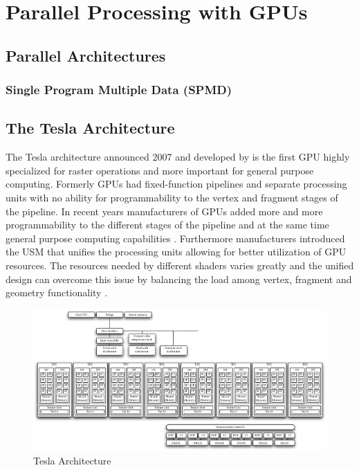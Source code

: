 

\chapter{Parallel Processing with GPUs}%
\label{cha:parallel_processing_with_gpu} 

\section{Parallel Architectures}
\label{sec:parallel_architectures} 

\subsection{Single Program Multiple Data (SPMD)}
\label{ssub:single_program_multiple_data_spmd} 



\section{The Tesla Architecture}%
\label{sub:the_tesla_architecture} 
The Tesla architecture announced 2007 and developed by {} is the first
\gls{GPU} highly specialized for raster operations and more important
for general purpose computing. Formerly \glspl{GPU} had fixed-function
pipelines and separate processing units with no ability for programmability to
the vertex and fragment stages of the pipeline. In recent years manufacturers of
\glspl{GPU} added more and more programmability to the different stages
of the pipeline and at the same time general purpose computing capabilities
\citep{citeulike:3844545}. Furthermore manufacturers introduced the  \gls{USM} 
that unifies the processing units allowing for better
utilization of  \gls{GPU} resources. The resources needed by different
shaders varies greatly and the unified design can overcome this issue by
balancing the load among vertex, fragment and geometry functionality
\citep{citeulike:3145468}.

\begin{figure}[ht]
\centering
\includegraphics[width=\textwidth]{gfx/tesla_architecture} 
\caption{Tesla Architecture} 
\label{fig:tesla_architecture} 
\end{figure} 

